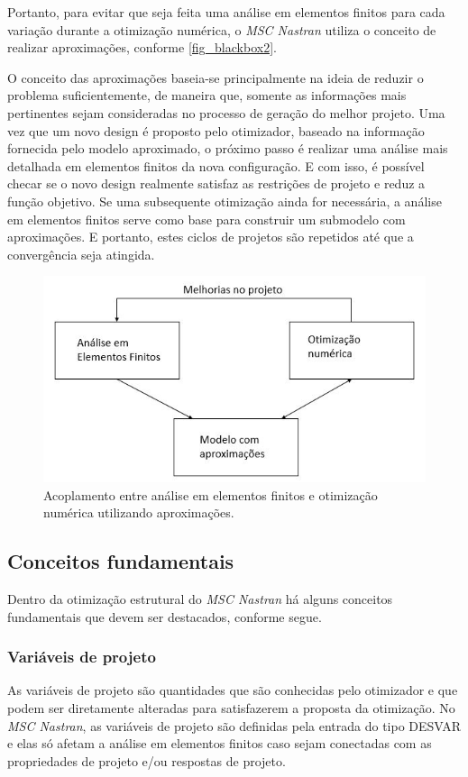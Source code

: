 Portanto, para evitar que seja feita uma análise em elementos finitos para cada variação durante a otimização numérica, o \emph{MSC Nastran} utiliza o conceito de realizar aproximações, conforme \autoref{fig_blackbox2}.

O conceito das aproximações baseia-se principalmente na ideia de reduzir o problema suficientemente, de maneira que, somente as informações mais pertinentes sejam consideradas no processo de geração do melhor projeto. Uma vez que um novo design é proposto pelo otimizador, baseado na informação fornecida pelo modelo aproximado, o próximo passo é realizar uma análise mais detalhada em elementos finitos da nova configuração. E com isso, é possível checar se o novo design realmente satisfaz as restrições de projeto e reduz a função objetivo. Se uma subsequente otimização ainda for necessária, a análise em elementos finitos serve como base para construir um submodelo com aproximações. E portanto, estes ciclos de projetos são repetidos até que a convergência seja atingida.

\begin{figure}[h]
	\caption{\label{fig_blackbox2}Acoplamento entre análise em elementos finitos e otimização numérica utilizando aproximações.}
  \centering
  \includegraphics[scale=0.7]{figura/Blackbox2}
\end{figure}

\subsection{Conceitos fundamentais}
Dentro da otimização estrutural do \emph{MSC Nastran} há alguns conceitos fundamentais que devem ser destacados, conforme segue.

\subsubsection{Variáveis de projeto}
As variáveis de projeto são quantidades que são conhecidas pelo otimizador e que podem ser diretamente alteradas para satisfazerem a proposta da otimização. No \emph{MSC Nastran}, as variáveis de projeto são definidas pela entrada do tipo DESVAR e elas só afetam a análise em elementos finitos caso sejam conectadas com as propriedades de projeto e/ou respostas de projeto.

